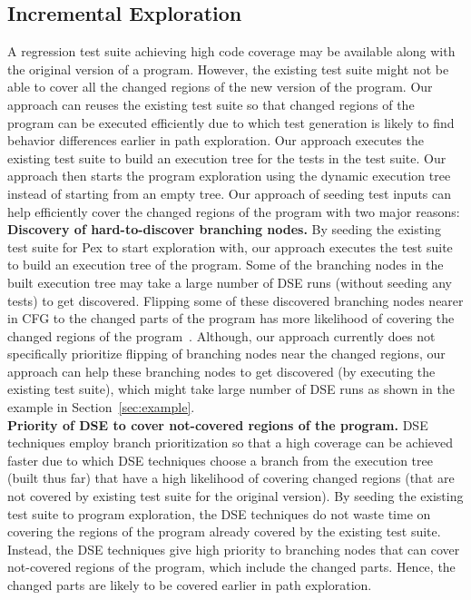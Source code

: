 \subsection{Incremental Exploration}
\label{sec:incremental}
A regression test suite achieving high code coverage may be available along with the original version of  a program. 
However, the existing test suite might not be able to cover all the changed regions of the new version of the program. Our approach can reuses the existing test suite so that changed regions of the program can be executed efficiently due to which test generation is likely to find behavior differences earlier in path exploration. Our approach executes the existing test suite to build an execution
tree for the tests in the test suite. Our approach then starts the program
exploration using the dynamic execution tree instead of starting from an empty
tree. Our approach of seeding test inputs can help efficiently cover the changed regions of the program with two major reasons:
\\ \textbf{Discovery of hard-to-discover branching nodes.} By seeding the existing test suite for Pex to start exploration with, our approach executes the test suite to build an execution tree of the program. Some of the branching nodes in the built execution tree may take a large number of DSE runs (without seeding any tests) to get discovered. Flipping some of these discovered branching nodes nearer in CFG to the changed parts of the
program has more likelihood of covering the changed regions of the program~\cite{burnim}. Although, our approach currently does not specifically prioritize flipping of branching nodes near the changed regions, our approach can help these branching nodes to get discovered (by executing the existing test suite), which might take large number of DSE runs as shown in the example in Section~\ref{sec:example}.
\\ \textbf{Priority of DSE to cover not-covered regions of the program.} DSE techniques employ branch prioritization so that a high coverage can be achieved faster due to which DSE techniques choose a branch from the execution tree (built thus far) that have a high likelihood of covering changed regions (that are not covered by existing test suite for the original version). By seeding the existing test suite to program exploration, the DSE techniques do not waste time on covering the regions of the program already covered by the existing test suite. Instead, the DSE techniques give high priority to branching nodes that can cover not-covered regions of the program, which include the changed parts. Hence, the changed parts are likely to be covered earlier in path exploration.
 
